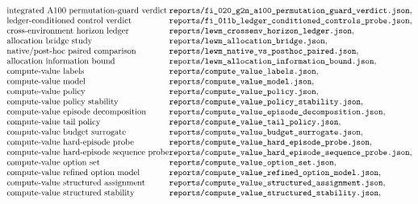 $$\begin{array}{@{}l@{}l@{}}
\text{integrated A100 permutation-guard verdict} & \texttt{reports/fi\_020\_g2n\_a100\_permutation\_guard\_verdict.json},\\
\text{ledger-conditioned control verdict} & \texttt{reports/fi\_011b\_ledger\_conditioned\_controls\_probe.json},\\
\text{cross-environment horizon ledger} & \texttt{reports/lewm\_crossenv\_horizon\_ledger.json},\\
\text{allocation bridge study} & \texttt{reports/lewm\_allocation\_bridge.json},\\
\text{native/post-hoc paired comparison} & \texttt{reports/lewm\_native\_vs\_posthoc\_paired.json},\\
\text{allocation information bound} & \texttt{reports/lewm\_allocation\_information\_bound.json},\\
\text{compute-value labels} & \texttt{reports/compute\_value\_labels.json},\\
\text{compute-value model} & \texttt{reports/compute\_value\_model.json},\\
\text{compute-value policy} & \texttt{reports/compute\_value\_policy.json},\\
\text{compute-value policy stability} & \texttt{reports/compute\_value\_policy\_stability.json},\\
\text{compute-value episode decomposition} & \texttt{reports/compute\_value\_episode\_decomposition.json},\\
\text{compute-value tail policy} & \texttt{reports/compute\_value\_tail\_policy.json},\\
\text{compute-value budget surrogate} & \texttt{reports/compute\_value\_budget\_surrogate.json},\\
\text{compute-value hard-episode probe} & \texttt{reports/compute\_value\_hard\_episode\_probe.json},\\
\text{compute-value hard-episode sequence probe} & \texttt{reports/compute\_value\_hard\_episode\_sequence\_probe.json},\\
\text{compute-value option set} & \texttt{reports/compute\_value\_option\_set.json},\\
\text{compute-value refined option model} & \texttt{reports/compute\_value\_refined\_option\_model.json},\\
\text{compute-value structured assignment} & \texttt{reports/compute\_value\_structured\_assignment.json},\\
\text{compute-value structured stability} & \texttt{reports/compute\_value\_structured\_stability.json},\\

\end{array}$$
